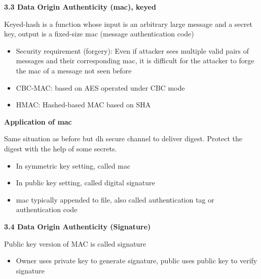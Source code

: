 \documentclass[landscape,a4paper]{extarticle}
\begin{document}
\begin{multicols*}{5}
    \textbf{3.3 Data Origin Authenticity (mac), keyed}

    Keyed-hash is a function whose input is an arbitrary large message and a secret key, output is a
    fixed-size mac (message authentication code)
    \begin{itemize}
        \item Security requirement (forgery): Even if attacker sees multiple valid pairs of messages and their
        corresponding mac, it is difficult for the attacker to forge the mac of a message not seen before
        \item CBC-MAC: based on AES operated under CBC mode
        \item HMAC: Hashed-based MAC based on SHA
    \end{itemize}

    \textbf{Application of mac}

    Same situation as before but dh secure channel to deliver digest. Protect the digest
    with the help of some secrets.
    \begin{itemize}
        \item In symmetric key setting, called mac
        \item In public key setting, called digital signature
        \item mac typically appended to file, also called authentication tag or authentication code
    \end{itemize}

    \textbf{3.4 Data Origin Authenticity (Signature)}

    Public key version of MAC is called signature
    \begin{itemize}
        \item Owner uses private key to generate signature, public uses public key to verify
        signature
    \end{itemize}


\end{multicols*}
\end{document}
